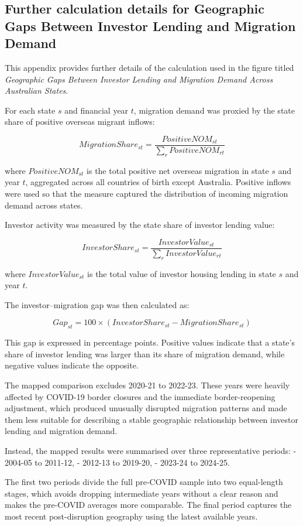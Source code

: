 \documentclass[
  11pt,
  a4paper,
]{article}
\begin{document}
\subsection{Further calculation details for Geographic Gaps Between
Investor Lending and Migration Demand}\label{sec-appendix-q3-gap}

This appendix provides further details of the calculation used in the
figure titled \emph{Geographic Gaps Between Investor Lending and
Migration Demand Across Australian States}.

For each state \(s\) and financial year \(t\), migration demand was
proxied by the state share of positive overseas migrant inflows:

\[
MigrationShare_{st} = \frac{PositiveNOM_{st}}{\sum_r PositiveNOM_{rt}}
\]

where \(PositiveNOM_{st}\) is the total positive net overseas migration
in state \(s\) and year \(t\), aggregated across all countries of birth
except Australia. Positive inflows were used so that the measure
captured the distribution of incoming migration demand across states.

Investor activity was measured by the state share of investor lending
value:

\[
InvestorShare_{st} = \frac{InvestorValue_{st}}{\sum_r InvestorValue_{rt}}
\]

where \(InvestorValue_{st}\) is the total value of investor housing
lending in state \(s\) and year \(t\).

The investor--migration gap was then calculated as:

\[
Gap_{st} = 100 \times \left( InvestorShare_{st} - MigrationShare_{st} \right)
\]

This gap is expressed in percentage points. Positive values indicate
that a state's share of investor lending was larger than its share of
migration demand, while negative values indicate the opposite.

The mapped comparison excludes 2020-21 to 2022-23. These years were
heavily affected by COVID-19 border closures and the immediate
border-reopening adjustment, which produced unusually disrupted
migration patterns and made them less suitable for describing a stable
geographic relationship between investor lending and migration demand.

Instead, the mapped results were summarised over three representative
periods: - 2004-05 to 2011-12, - 2012-13 to 2019-20, - 2023-24 to
2024-25.

The first two periods divide the full pre-COVID sample into two
equal-length stages, which avoids dropping intermediate years without a
clear reason and makes the pre-COVID averages more comparable. The final
period captures the most recent post-disruption geography using the
latest available years.
\end{document}
